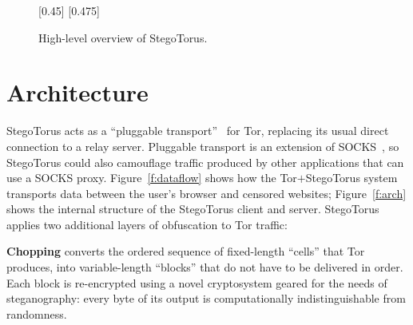 \begin{figure*}[t!]
\centering
{}%
[0.45\linewidth]{\centering}%
\hspace{0.5cm}%
%
[0.475\linewidth]{\centering}%
\caption{High-level overview of StegoTorus.}
\end{figure*}

\section{Architecture}\label{s:arch}

StegoTorus acts as a “pluggable transport”~\cite{s-tor-plugtrans} for
Tor, replacing its usual direct connection to a relay server.
Pluggable transport is an extension of SOCKS~\cite{s-socks}, so
StegoTorus could also camouflage traffic produced by other
applications that can use a SOCKS proxy. Figure~\ref{f:dataflow} shows
how the Tor$+$StegoTorus system transports data between the user's
browser and censored websites; Figure~\ref{f:arch} shows the internal
structure of the StegoTorus client and server.  StegoTorus applies two
additional layers of obfuscation to Tor traffic:

\textbf{Chopping} converts the ordered sequence of fixed-length “cells”
that Tor produces, into variable-length “blocks” that do not have to
be delivered in order. Each block is re-encrypted using a novel
cryptosystem geared for the needs of steganography: every byte of its
output is computationally indistinguishable from randomness.

